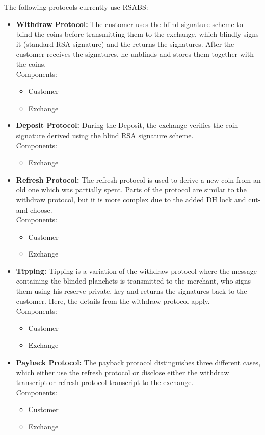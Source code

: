 The following protocols currently use \gls{RSABS}:
\begin{itemize}
    \item \textbf{Withdraw Protocol:}
          The customer uses the blind signature scheme to blind the coins before transmitting them to the exchange, which blindly signs it (standard RSA signature) and the returns the signatures.
          After the customer receives the signatures, he unblinds and stores them together with the coins.
          \\ Components:
          \begin{itemize}
              \item Customer
              \item Exchange
          \end{itemize}
    \item \textbf{Deposit Protocol:}
          During the Deposit, the exchange verifies the coin signature derived using the blind RSA signature scheme.
          \\ Components:
          \begin{itemize}
              \item Exchange
          \end{itemize}
    \item \textbf{Refresh Protocol:}
          The refresh protocol is used to derive a new coin from an old one which was partially spent.
          Parts of the protocol are similar to the withdraw protocol, but it is more complex due to the added DH lock and cut-and-choose.
          \\ Components:
          \begin{itemize}
              \item Customer
              \item Exchange
          \end{itemize}
    \item \textbf{Tipping:}
          Tipping is a variation of the withdraw protocol where the message containing the blinded planchets is transmitted to the merchant, who signs them using his reserve private, key and returns the signatures back to the customer.
          Here, the details from the withdraw protocol apply.
          \\ Components:
          \begin{itemize}
              \item Customer
              \item Exchange
          \end{itemize}
    \item \textbf{Payback Protocol:}
          The payback protocol distinguishes three different cases, which either use the refresh protocol or disclose either the withdraw transcript or refresh protocol transcript to the exchange.
          \\ Components:
          \begin{itemize}
              \item Customer
              \item Exchange
          \end{itemize}
\end{itemize}



